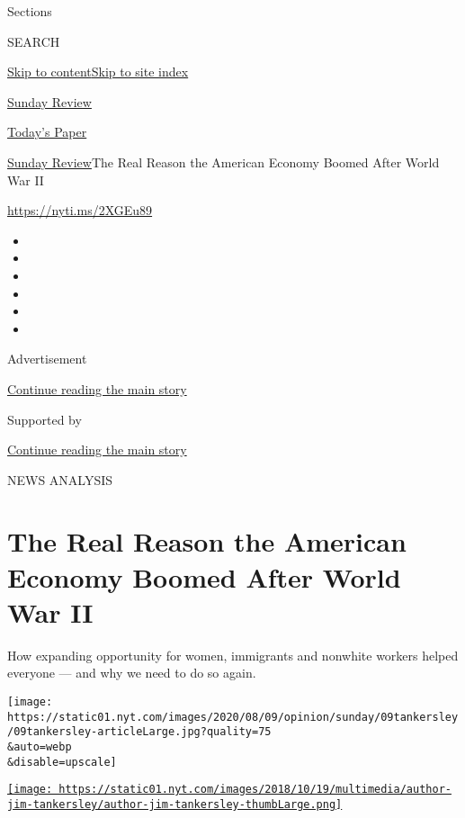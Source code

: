 Sections

SEARCH

\protect\hyperlink{site-content}{Skip to
content}\protect\hyperlink{site-index}{Skip to site index}

\href{https://www.nytimes.com/section/opinion/sunday}{Sunday Review}

\href{https://myaccount.nytimes.com/auth/login?response_type=cookie\&client_id=vi}{}

\href{https://www.nytimes.com/section/todayspaper}{Today's Paper}

\href{/section/opinion/sunday}{Sunday Review}\textbar{}The Real Reason
the American Economy Boomed After World War II

\href{https://nyti.ms/2XGEu89}{https://nyti.ms/2XGEu89}

\begin{itemize}
\item
\item
\item
\item
\item
\item
\end{itemize}

Advertisement

\protect\hyperlink{after-top}{Continue reading the main story}

Supported by

\protect\hyperlink{after-sponsor}{Continue reading the main story}

NEWS ANALYSIS

\hypertarget{the-real-reason-the-american-economy-boomed-after-world-war-ii}{%
\section{The Real Reason the American Economy Boomed After World War
II}\label{the-real-reason-the-american-economy-boomed-after-world-war-ii}}

How expanding opportunity for women, immigrants and nonwhite workers
helped everyone --- and why we need to do so again.

\texttt{[image: https://static01.nyt.com/images/2020/08/09/opinion/sunday/09tankersley/09tankersley-articleLarge.jpg?quality=75\\\&auto=webp\\\&disable=upscale]}

\href{https://www.nytimes.com/by/jim-tankersley}{\texttt{[image: https://static01.nyt.com/images/2018/10/19/multimedia/author-jim-tankersley/author-jim-tankersley-thumbLarge.png]}}

